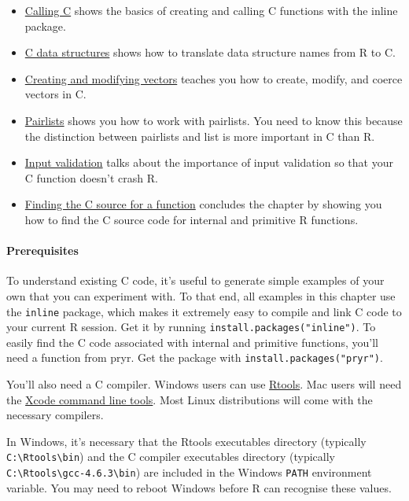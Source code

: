 \begin{itemize}
\item
  \protect\hyperlink{calling-c}{Calling C} shows the basics of creating
  and calling C functions with the inline package.
\item
  \protect\hyperlink{c-data-structures}{C data structures} shows how to
  translate data structure names from R to C.
\item
  \protect\hyperlink{c-vectors}{Creating and modifying vectors} teaches
  you how to create, modify, and coerce vectors in C.
\item
  \protect\hyperlink{c-pairlists}{Pairlists} shows you how to work with
  pairlists. You need to know this because the distinction between
  pairlists and list is more important in C than R.
\item
  \protect\hyperlink{c-input-validation}{Input validation} talks about
  the importance of input validation so that your C function doesn't
  crash R.
\item
  \protect\hyperlink{c-find-source}{Finding the C source for a function}
  concludes the chapter by showing you how to find the C source code for
  internal and primitive R functions.
\end{itemize}

\hypertarget{prerequisites}{%
\paragraph{Prerequisites}\label{prerequisites}}

To understand existing C code, it's useful to generate simple examples
of your own that you can experiment with. To that end, all examples in
this chapter use the \texttt{inline} package, which makes it extremely
easy to compile and link C code to your current R session. Get it by
running \texttt{install.packages("inline")}. To easily find the C code
associated with internal and primitive functions, you'll need a function
from pryr. Get the package with \texttt{install.packages("pryr")}.

You'll also need a C compiler. Windows users can use
\href{http://cran.r-project.org/bin/windows/Rtools/}{Rtools}. Mac users
will need the \href{http://developer.apple.com/}{Xcode command line
tools}. Most Linux distributions will come with the necessary compilers.

In Windows, it's necessary that the Rtools executables directory
(typically \texttt{C:\textbackslash{}Rtools\textbackslash{}bin}) and the
C compiler executables directory (typically
\texttt{C:\textbackslash{}Rtools\textbackslash{}gcc-4.6.3\textbackslash{}bin})
are included in the Windows \texttt{PATH} environment variable. You may
need to reboot Windows before R can recognise these values.

